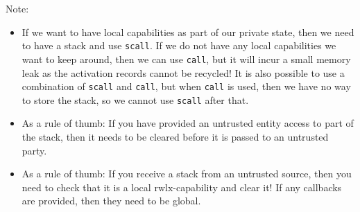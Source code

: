 \documentclass[a4paper]{article}
\newcommand{\plainperm}[1]{\mathrm{#1}}
\newcommand{\rwlx}{\plainperm{rwlx}}
\begin{document}
              Note:
              \begin{itemize}
              \item If we want to have local capabilities as part of our private state, then we need to have a stack and use \texttt{scall}. If we do not have any local capabilities we want to keep around, then we can use \texttt{call}, but it will incur a small memory leak as the activation records cannot be recycled! It is also possible to use a combination of \texttt{scall} and \texttt{call}, but when \texttt{call} is used, then we have no way to store the stack, so we cannot use \texttt{scall} after that.
              \item As a rule of thumb: If you have provided an untrusted entity access to part of the stack, then it needs to be cleared before it is passed to an untrusted party.
              \item As a rule of thumb: If you receive a stack from an untrusted source, then you need to check that it is a local $\rwlx$-capability and clear it! If any callbacks are provided, then they need to be global.
              \end{itemize}
\end{document}
